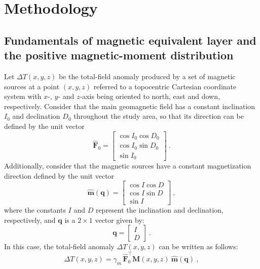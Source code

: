\section{Methodology}
\label{sec:methodology}

\subsection{Fundamentals of magnetic equivalent layer and the positive magnetic-moment distribution}
\label{subsec:mag_eqlayer}

Let $\Delta T(x, y, z)$ be the total-field anomaly produced by a set of magnetic
sources at a point $(x, y, z)$ referred to a topocentric Cartesian coordinate system 
with $x$-, $y$- and $z$-axis being oriented to north, east and down, respectively.
Consider that the main geomagnetic field has a constant inclination $I_{0}$ and declination
$D_{0}$ throughout the study area, so that its direction can be defined by the unit vector
\begin{equation}
\hat{\mathbf{F}}_{0} = \begin{bmatrix}
\cos I_{0} \cos D_{0} \\
\cos I_{0} \sin D_{0} \\
\sin I_{0}
\end{bmatrix} \: .
\label{eq:main_field}
\end{equation}
Additionally, consider that the magnetic sources have a constant magnetization direction
defined by the unit vector
\begin{equation}
\hat{\mathbf{m}}(\mathbf{q}) = \begin{bmatrix}
\cos {I} \cos {D} \\
\cos {I} \sin {D} \\
\sin {I}
\end{bmatrix} \: ,
\label{eq:mag_vec}
\end{equation}
where the constants $I$ and $D$ represent the inclination and declination, respectively,
and $\mathbf{q}$ is a $2 \times 1$ vector given by:
\begin{equation}
\mathbf{q} = \begin{bmatrix}
I \\ 
D
\end{bmatrix} \: .
\label{eq:q_vector}
\end{equation}
In this case, the total-field anomaly $\Delta T(x, y, z)$ can be written as follows:
\begin{equation}
\Delta T(x, y, z) = \gamma_{m} \, \hat{\mathbf{F}}_{0}^{\top} \mathbf{M}(x, y, z) \: 
\hat{\mathbf{m}}(\mathbf{q}) \: ,
\label{eq:tfanomaly}
\end{equation}
